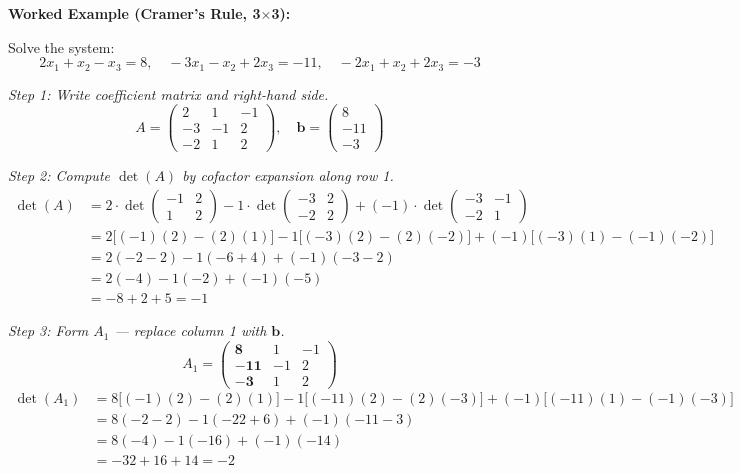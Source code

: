 \documentclass[12pt,a4paper]{article}
\begin{document}
\textbf{Worked Example (Cramer's Rule, 3$\times$3):}

Solve the system:
\[
2x_1 + x_2 - x_3 = 8, \quad -3x_1 - x_2 + 2x_3 = -11, \quad -2x_1 + x_2 + 2x_3 = -3
\]

\textit{Step 1: Write coefficient matrix and right-hand side.}
\[
A = \begin{pmatrix} 2 & 1 & -1 \\ -3 & -1 & 2 \\ -2 & 1 & 2 \end{pmatrix}, \quad \mathbf{b} = \begin{pmatrix} 8 \\ -11 \\ -3 \end{pmatrix}
\]

\textit{Step 2: Compute \(\det(A)\) by cofactor expansion along row 1.}
\begin{align*}
\det(A) &= 2 \cdot \det\begin{pmatrix}-1&2\\1&2\end{pmatrix}
         - 1 \cdot \det\begin{pmatrix}-3&2\\-2&2\end{pmatrix}
         + (-1) \cdot \det\begin{pmatrix}-3&-1\\-2&1\end{pmatrix} \\
&= 2\bigl[(-1)(2)-(2)(1)\bigr]
  - 1\bigl[(-3)(2)-(2)(-2)\bigr]
  + (-1)\bigl[(-3)(1)-(-1)(-2)\bigr] \\
&= 2(-2-2) - 1(-6+4) + (-1)(-3-2) \\
&= 2(-4) - 1(-2) + (-1)(-5) \\
&= -8 + 2 + 5 = -1
\end{align*}

\textit{Step 3: Form \(A_1\) --- replace column 1 with \(\mathbf{b}\).}
\[
A_1 = \begin{pmatrix} \mathbf{8} & 1 & -1 \\ \mathbf{-11} & -1 & 2 \\ \mathbf{-3} & 1 & 2 \end{pmatrix}
\]
\begin{align*}
\det(A_1) &= 8\bigl[(-1)(2)-(2)(1)\bigr]
            - 1\bigl[(-11)(2)-(2)(-3)\bigr]
            + (-1)\bigl[(-11)(1)-(-1)(-3)\bigr] \\
&= 8(-2-2) - 1(-22+6) + (-1)(-11-3) \\
&= 8(-4) - 1(-16) + (-1)(-14) \\
&= -32 + 16 + 14 = -2
\end{align*}
\end{document}
